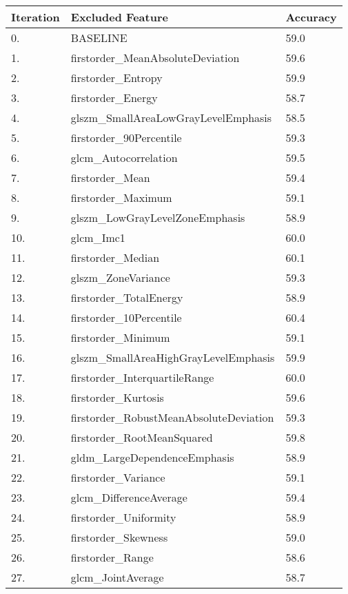 {\footnotesize
\begin{longtable}[H]{|l|l|l|}
\hline
\textbf{Iteration} & \textbf{Excluded Feature} & \textbf{Accuracy} \\ \hline
0. & BASELINE & 59.0 \\ \hline
1. & firstorder\_MeanAbsoluteDeviation & 59.6 \\ \hline
2. & firstorder\_Entropy & 59.9 \\ \hline
3. & firstorder\_Energy & 58.7 \\ \hline
4. & glszm\_SmallAreaLowGrayLevelEmphasis & 58.5 \\ \hline
5. & firstorder\_90Percentile & 59.3 \\ \hline
6. & glcm\_Autocorrelation & 59.5 \\ \hline
7. & firstorder\_Mean & 59.4 \\ \hline
8. & firstorder\_Maximum & 59.1 \\ \hline
9. & glszm\_LowGrayLevelZoneEmphasis & 58.9 \\ \hline
10. & glcm\_Imc1 & 60.0 \\ \hline
11. & firstorder\_Median & 60.1 \\ \hline
12. & glszm\_ZoneVariance & 59.3 \\ \hline
13. & firstorder\_TotalEnergy & 58.9 \\ \hline
14. & firstorder\_10Percentile & 60.4 \\ \hline
15. & firstorder\_Minimum & 59.1 \\ \hline
16. & glszm\_SmallAreaHighGrayLevelEmphasis & 59.9 \\ \hline
17. & firstorder\_InterquartileRange & 60.0 \\ \hline
18. & firstorder\_Kurtosis & 59.6 \\ \hline
19. & firstorder\_RobustMeanAbsoluteDeviation & 59.3 \\ \hline
20. & firstorder\_RootMeanSquared & 59.8 \\ \hline
21. & gldm\_LargeDependenceEmphasis & 58.9 \\ \hline
22. & firstorder\_Variance & 59.1 \\ \hline
23. & glcm\_DifferenceAverage & 59.4 \\ \hline
24. & firstorder\_Uniformity & 58.9 \\ \hline
25. & firstorder\_Skewness & 59.0 \\ \hline
26. & firstorder\_Range & 58.6 \\ \hline
27. & glcm\_JointAverage & 58.7 \\ \hline

\end{longtable}}
